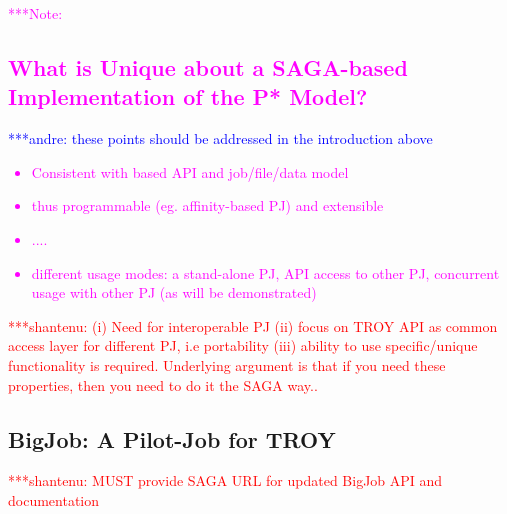 \documentclass[conference,final]{IEEEtran}
\newcommand{\jhanote}[1]{ {\textcolor{red} { ***shantenu: #1 }}}
\newcommand{\alnote}[1]{ {\textcolor{blue} { ***andre: #1 }}}
\newcommand{\note}[1]{ {\textcolor{magenta} { ***Note: #1 }}}
\newcommand{\alnote}[1]{}
\newcommand{\jhanote}[1]{}
\newcommand{\note}[1]{}
\newcommand{\upp}{\vspace*{-0.5em}}
\begin{document}
 


\note{
\subsection{What is Unique about a SAGA-based Implementation of the
  P* Model?}
\alnote{these points should be addressed in the introduction above}
\begin{itemize}
\item Consistent with based API and job/file/data model
\item thus programmable (eg. affinity-based PJ) and extensible 
\item ....
\item different usage modes: a stand-alone PJ, API access to other PJ,
  concurrent usage with other PJ (as will be demonstrated)
\end{itemize}
\jhanote{(i) Need for interoperable PJ (ii) focus on TROY API as
  common access layer for different PJ, i.e portability (iii) ability
  to use specific/unique functionality is required. Underlying
  argument is that if you need these properties, then you need to do
  it the SAGA way..}
}
\subsection{BigJob: A Pilot-Job for TROY\upp\upp}

\jhanote{MUST provide SAGA URL for updated BigJob API and
  documentation}


\end{document}
